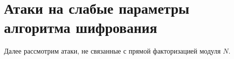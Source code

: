 \documentclass[12pt,a4paper]{scrartcl}
\begin{document}
\section{Атаки на слабые параметры алгоритма шифрования}

Далее рассмотрим атаки, не связанные с прямой факторизацией модуля $N$.
\end{document}
